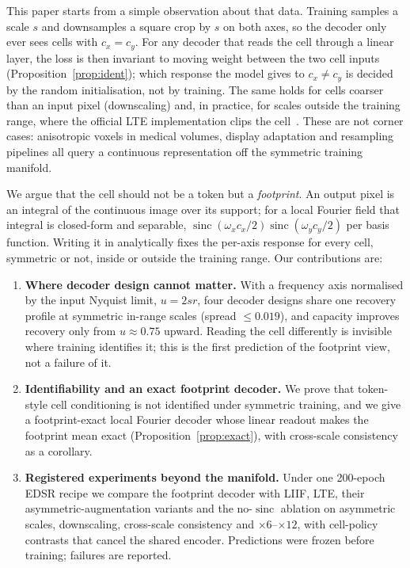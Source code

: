 \documentclass[conference]{IEEEtran}
\newcommand{\sinc}{\operatorname{sinc}}
\begin{document}
This paper starts from a simple observation about that data. Training samples a scale $s$ and downsamples a square crop by $s$ on both axes, so the decoder only ever sees cells with $c_x=c_y$. For any decoder that reads the cell through a linear layer, the loss is then invariant to moving weight between the two cell inputs (Proposition~\ref{prop:ident}); which response the model gives to $c_x\neq c_y$ is decided by the random initialisation, not by training. The same holds for cells coarser than an input pixel (downscaling) and, in practice, for scales outside the training range, where the official LTE implementation clips the cell~\cite{lee2022lte}. These are not corner cases: anisotropic voxels in medical volumes, display adaptation and resampling pipelines all query a continuous representation off the symmetric training manifold.

We argue that the cell should not be a token but a \emph{footprint}. An output pixel is an integral of the continuous image over its support; for a local Fourier field that integral is closed-form and separable, $\sinc(\omega_x c_x/2)\sinc(\omega_y c_y/2)$ per basis function. Writing it in analytically fixes the per-axis response for every cell, symmetric or not, inside or outside the training range. Our contributions are:
\begin{enumerate}
\item \textbf{Where decoder design cannot matter.} With a frequency axis normalised by the input Nyquist limit, $u=2sr$, four decoder designs share one recovery profile at symmetric in-range scales (spread $\le 0.019$), and capacity improves recovery only from $u\approx0.75$ upward. Reading the cell differently is invisible where training identifies it; this is the first prediction of the footprint view, not a failure of it.
\item \textbf{Identifiability and an exact footprint decoder.} We prove that token-style cell conditioning is not identified under symmetric training, and we give a footprint-exact local Fourier decoder whose linear readout makes the footprint mean exact (Proposition~\ref{prop:exact}), with cross-scale consistency as a corollary.
\item \textbf{Registered experiments beyond the manifold.} Under one 200-epoch EDSR recipe we compare the footprint decoder with LIIF, LTE, their asymmetric-augmentation variants and the no-$\sinc$ ablation on asymmetric scales, downscaling, cross-scale consistency and $\times6$--$\times12$, with cell-policy contrasts that cancel the shared encoder. Predictions were frozen before training; failures are reported.
\end{enumerate}
\end{document}
